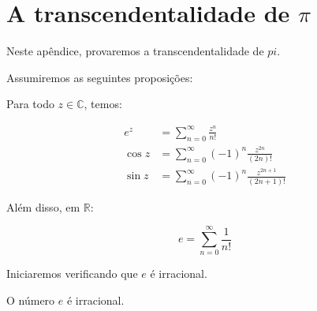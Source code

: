\chapter[A transcendentalidade de pi]{A transcendentalidade de $\pi$}

Neste apêndice, provaremos a transcendentalidade de $pi$.

Assumiremos as seguintes proposições:
\begin{lemma}
    Para todo $z \in \mathbb C$, temos:

    \begin{align*}
        e^z&=\sum_{n=0}^\infty \frac{z^n}{n!}\\
        \cos z&=\sum_{n=0}^\infty (-1)^n\frac{z^{2n}}{(2n)!}\\
        \sin z&=\sum_{n=0}^\infty (-1)^n\frac{z^{2n+1}}{(2n+1)!}
    \end{align*}

    Além disso, em $\mathbb R$:

    \begin{equation*}
        e=\sum_{n=0}^\infty \frac{1}{n!}
    \end{equation*}
\end{lemma}
Iniciaremos verificando que $e$ é irracional.
\begin{prop}
    O número $e$ é irracional.
\end{prop}